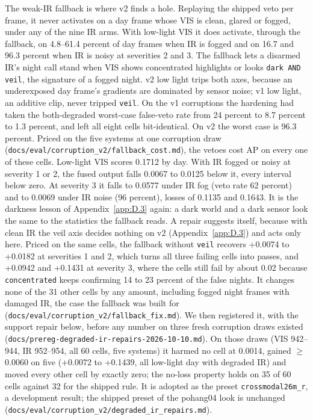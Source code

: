 \documentclass[journal,onecolumn]{IEEEtran}
\begin{document}
The weak-IR fallback is where v2 finds a hole. Replaying the shipped veto per frame, it never activates on a day frame whose VIS is clean, glared or fogged, under any of the nine IR arms. With low-light VIS it does activate, through the fallback, on 4.8--61.4 percent of day frames when IR is fogged and on 16.7 and 96.3 percent when IR is noisy at severities 2 and 3. The fallback lets a disarmed IR's night call stand when VIS shows concentrated highlights or looks \texttt{dark AND veil}, the signature of a fogged night. v2 low light trips both axes, because an underexposed day frame's gradients are dominated by sensor noise; v1 low light, an additive clip, never tripped \texttt{veil}. On the v1 corruptions the hardening had taken the both-degraded worst-case false-veto rate from 24 percent to 8.7 percent to 1.3 percent, and left all eight cells bit-identical. On v2 the worst case is 96.3 percent. Priced on the five systems at one corruption draw (\texttt{docs/\allowbreak{}eval/\allowbreak{}corruption\_\allowbreak{}v2/\allowbreak{}fallback\_\allowbreak{}cost.md}), the vetoes cost AP on every one of these cells. Low-light VIS scores 0.1712 by day. With IR fogged or noisy at severity 1 or 2, the fused output falls 0.0067 to 0.0125 below it, every interval below zero. At severity 3 it falls to 0.0577 under IR fog (veto rate 62 percent) and to 0.0069 under IR noise (96 percent), losses of 0.1135 and 0.1643. It is the darkness lesson of Appendix~\ref{app:D.3} again: a dark world and a dark sensor look the same to the statistics the fallback reads. A repair suggests itself, because with clean IR the veil axis decides nothing on v2 (Appendix~\ref{app:D.3}) and acts only here. Priced on the same cells, the fallback without \texttt{veil} recovers +0.0074 to +0.0182 at severities 1 and 2, which turns all three failing cells into passes, and +0.0942 and +0.1431 at severity 3, where the cells still fail by about 0.02 because \texttt{concentrated} keeps confirming 14 to 23 percent of the false nights. It changes none of the 31 other cells by any amount, including fogged night frames with damaged IR, the case the fallback was built for (\texttt{docs/\allowbreak{}eval/\allowbreak{}corruption\_\allowbreak{}v2/\allowbreak{}fallback\_\allowbreak{}fix.md}). We then registered it, with the support repair below, before any number on three fresh corruption draws existed (\texttt{docs/\allowbreak{}prereg-\allowbreak{}degraded-\allowbreak{}ir-\allowbreak{}repairs-\allowbreak{}2026-\allowbreak{}10-\allowbreak{}10.md}). On those draws (VIS 942--944, IR 952--954, all 60 cells, five systems) it harmed no cell at 0.0014, gained $\geq$ 0.0060 on five (+0.0072 to +0.1439, all low-light day with degraded IR) and moved every other cell by exactly zero; the no-loss property holds on 35 of 60 cells against 32 for the shipped rule. It is adopted as the preset \texttt{crossmodal26m\_\allowbreak{}r}, a development result; the shipped preset of the pohang04 look is unchanged (\texttt{docs/\allowbreak{}eval/\allowbreak{}corruption\_\allowbreak{}v2/\allowbreak{}degraded\_\allowbreak{}ir\_\allowbreak{}repairs.md}).
\end{document}
